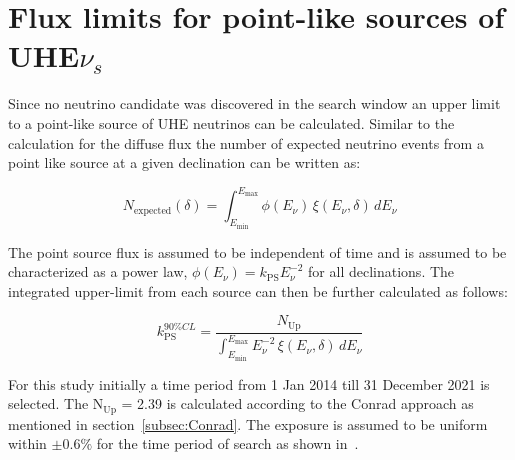 
\section{Flux limits for point-like sources of UHE$\nu_s$}
\label{sec:pfux_limit}
Since no neutrino candidate was discovered in the search window an upper limit to a  point-like source of UHE neutrinos can be calculated. Similar to the calculation for the diffuse flux the number of expected neutrino events from a point like source at a given declination can be written as:

\begin{equation}
  N_{\text{expected}}(\delta) = \int_{E_{\text{min}}}^{E_{\text{max}}}  \phi(E_{\nu}) \, \xi(E_{\nu}, \delta) \, dE_{\nu}
\end{equation}

The point source flux is assumed to be independent of time and is assumed to be characterized as a power law, $\phi(E_{\nu}) = k_{\text{PS}} E_{\nu}^{-2}$ for all declinations. The integrated upper-limit from each source can then be further calculated as follows:

\begin{equation}
  \label{eq:point_flux_limit}
  k_{\text{PS}}^{90\%CL} = \frac{N_{\text{Up}}}{\int_{E_{\text{min}}}^{E_{\text{max}}} E_{\nu}^{-2} \, \xi(E_{\nu}, \delta) \, dE_{\nu}}
\end{equation}

For this study initially a time period from 1 Jan 2014 till 31 December 2021 is selected. The N$_{\text{Up}}$ = 2.39 is calculated according to the Conrad approach as mentioned in section~\ref{subsec:Conrad}. The exposure is assumed to be uniform within $\pm 0.6\%$ for the time period of search as shown in~\cite{PierreAuger:2017pzq}. 


